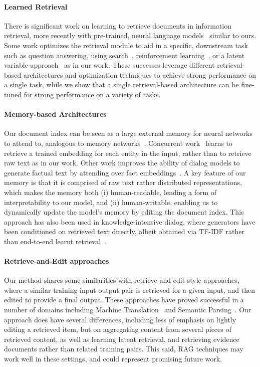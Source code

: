 \documentclass{article}
\begin{document}
\paragraph{Learned Retrieval}
There is significant work on learning to retrieve documents in information retrieval, more recently with pre-trained, neural language models~\cite{nogueira2019passage,Karpukhin20dense} similar to ours.
Some work optimizes the retrieval module to aid in a specific, downstream task such as question answering, using search~\cite{perez-etal-2019-finding}, reinforcement learning~\cite{choi-etal-2017-coarse,wang2018evidence-aggregation,wang2018r3}, or a latent variable approach~\cite{lee-etal-2019-latent,guu2020realm} as in our work.
These successes leverage different retrieval-based architectures and optimization techniques to achieve strong performance on a single task, while we show that a single retrieval-based architecture can be fine-tuned for strong performance on a variety of tasks.

\paragraph{Memory-based Architectures}
Our document index can be seen as a large external memory for neural networks to attend to, analogous to memory networks~\cite{weston2015memory,sukhbaatar2015end}.
Concurrent work~\cite{fevry2020entities} learns to retrieve a trained embedding for each entity in the input, rather than to retrieve raw text as in our work.
Other work improves the ability of dialog models to generate factual text by attending over fact embeddings~\cite{ghazvininejad2018knowledge,fan2020augmenting}. A key feature of our memory is that it is comprised of raw text rather distributed representations, which makes the memory both (i) human-readable, lending a form of interpretability to our model, and (ii) human-writable, enabling us to dynamically update the model's memory by editing the document index. This approach has also been used in knowledge-intensive dialog, where generators have been conditioned on retrieved text directly, albeit obtained via TF-IDF rather than end-to-end learnt retrieval~\cite{dinan2018wizard}.


\paragraph{Retrieve-and-Edit approaches} Our method shares some similarities with retrieve-and-edit style approaches, where a similar training input-output pair is retrieved for a given input, and then edited to provide a final output. These approaches have proved successful in a number of domains including  Machine Translation~ \cite{gu_mt_retrieve_and_edit,hossain-etal-2020-simple} and Semantic Parsing~\cite{NIPS2018_8209}. Our approach does have several differences, including less of emphasis on lightly editing a retrieved item, but on aggregating content from several pieces of retrieved content, as well as learning latent retrieval, and retrieving evidence documents rather than related training pairs. This said, RAG techniques may work well in these settings, and could represent promising future work.
\end{document}

